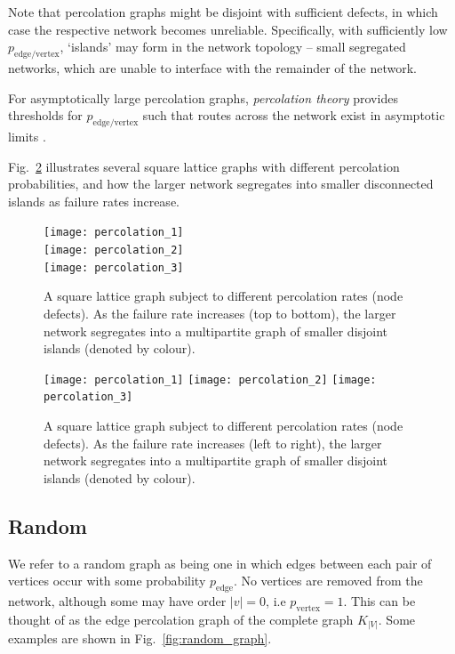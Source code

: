 Note that percolation graphs might be disjoint with sufficient defects, in which case the respective network becomes unreliable. Specifically, with sufficiently low $p_\mathrm{edge/vertex}$, `islands' may form in the network topology -- small segregated networks, which are unable to interface with the remainder of the network.

For asymptotically large percolation graphs, \textit{percolation theory} \cite{???} provides thresholds for $p_\mathrm{edge/vertex}$ such that routes across the network exist in asymptotic limits \cite{???}.

Fig.~\ref{fig:perc_graph} illustrates several square lattice graphs with different percolation probabilities, and how the larger network segregates into smaller disconnected islands as failure rates increase.

\pubmode
	\begin{figure}[!htbp]
	\texttt{[image: percolation\_1]}\\
	\texttt{[image: percolation\_2]}\\
	\texttt{[image: percolation\_3]}
	\captionspacefig \caption{A square lattice graph subject to different percolation rates (node defects). As the failure rate increases (top to bottom), the larger network segregates into a multipartite graph of smaller disjoint islands (denoted by colour).} \label{fig:perc_graph}
	\end{figure}
\else
	\begin{figure}[!htbp]
	\texttt{[image: percolation\_1]}
	\texttt{[image: percolation\_2]}
	\texttt{[image: percolation\_3]}
	\captionspacefig \caption{A square lattice graph subject to different percolation rates (node defects). As the failure rate increases (left to right), the larger network segregates into a multipartite graph of smaller disjoint islands (denoted by colour).} \label{fig:perc_graph}
	\end{figure}
\fi

%
%

\subsection{Random}

We refer to a random graph as being one in which edges between each pair of vertices occur with some probability $p_\mathrm{edge}$. No vertices are removed from the network, although some may have order \mbox{$|v|=0$}, i.e \mbox{$p_\mathrm{vertex}=1$}. This can be thought of as the edge percolation graph of the complete graph $K_{|V|}$. Some examples are shown in Fig.~\ref{fig:random_graph}.

